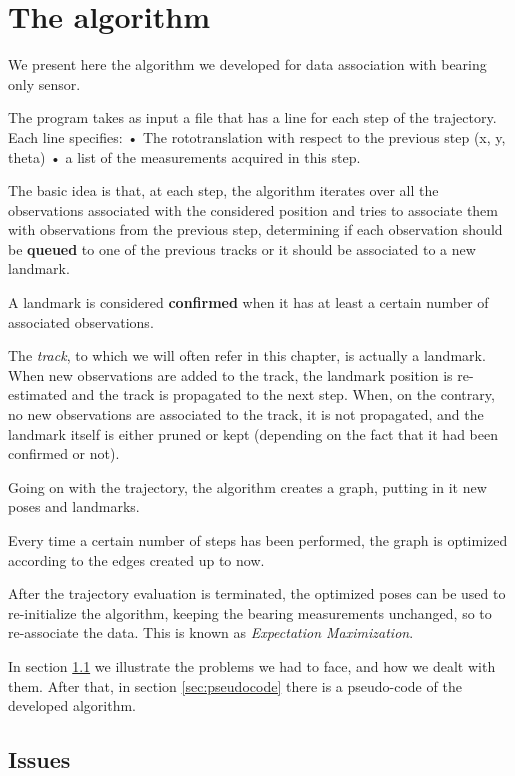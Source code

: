 \chapter{The algorithm}\label{cap:Algorithm}
We present here the algorithm we developed for data association with bearing only sensor.

The program takes as input a file that has a line for each step of the trajectory.
Each line specifies:
• The rototranslation with respect to the previous step (x, y, theta)
• a list of the measurements acquired in this step.

The basic idea is that, at each step, the algorithm iterates over all the observations associated with the considered position and tries to associate them with observations from the previous step, determining if each observation should be \textbf{queued} to one of the previous tracks or it should be associated to a new landmark.

A landmark is considered \textbf{confirmed} when it has at least a certain number of associated observations.

The \textit{track}, to which we will often refer in this chapter, is actually a landmark. When new observations are added to the track, the landmark position is re-estimated and the track is propagated to the next step.
When, on the contrary, no new observations are associated to the track, it is not propagated, and the landmark itself is either pruned or kept (depending on the fact that it had been confirmed or not).

Going on with the trajectory, the algorithm creates a graph, putting in it new poses and landmarks.

Every time a certain number of steps has been performed, the graph is optimized according to the edges created up to now.

After the trajectory evaluation is terminated, the optimized poses can be used to re-initialize the algorithm, keeping the bearing measurements unchanged, so to re-associate the data. This is known as \textit{Expectation Maximization}.

In section \ref{sec:issues} we illustrate the problems we had to face, and how we dealt with them.
After that, in section \ref{sec:pseudocode} there is a pseudo-code of the developed algorithm.

\section{Issues}\label{sec:issues}
